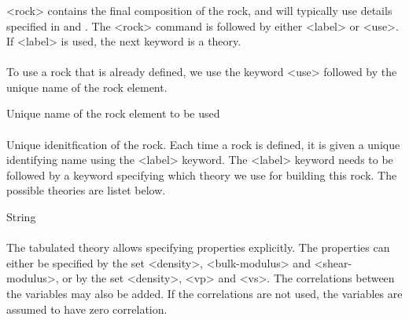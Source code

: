 {\subsubsection{}
 \slist
   \item \Description <rock> contains the final composition of the rock, and will typically use details specified in  and . The <rock> command is followed by either <label> or <use>. If <label> is used, the next keyword is a theory.
   \item \Argument 
   \item \Default 
 \elist

\paragraph{}
 \slist
   \item \Description To use a rock that is already defined, we use the keyword <use> followed by the unique name of the rock element.
   \item \Argument Unique name of the rock element to be used
   \item \Default 
 \elist

\paragraph{}
 \slist
   \item \Description Unique idenitfication of the rock. Each time a rock is defined, it is given a unique identifying name using
the <label> keyword. The <label> keyword needs to be followed by a keyword specifying which theory we use for building this rock. The possible theories are listet below. 
   \item \Argument String
   \item \Default 
 \elist

\paragraph{}
 \slist
   \item \Description The tabulated theory allows specifying properties explicitly. The properties can either be specified by the set <density>, <bulk-modulus> and <shear-modulus>, or by the set <density>, <vp> and <vs>. The correlations between the variables may also be added. If the correlations are not used, the variables are assumed to have zero correlation. 
   \item \Argument
   \item \Default 
 \elist

}
